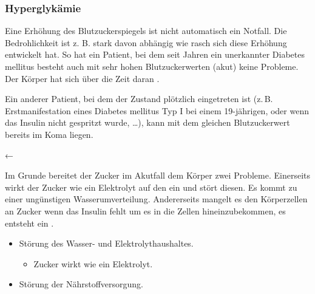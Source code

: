 \subsubsection{Hyperglykämie}
\label{topic:hyperglykaemie}



{
Eine Erhöhung des Blutzuckerspiegels ist nicht automatisch ein Notfall. Die
Bedrohlichkeit ist z. B. stark davon abhängig wie
rasch sich diese Erhöhung entwickelt hat. So hat ein
Patient, bei dem seit Jahren ein unerkannter Diabetes mellitus besteht auch mit sehr hohen Blutzuckerwerten (akut) keine
Probleme. Der Körper hat sich über die Zeit daran . 

Ein anderer
Patient, bei dem der Zustand plötzlich eingetreten ist (z.\,B.
Erstmanifestation eines Diabetes mellitus Typ I bei einem 19-jährigen, oder wenn
das Insulin nicht gespritzt wurde, \ldots), kann mit dem gleichen
Blutzuckerwert bereits im Koma liegen. 

 }
{←}
{}{}{}



{
Im Grunde bereitet der Zucker im Akutfall dem Körper zwei
Probleme. Einerseits wirkt der Zucker wie ein Elektrolyt auf den  ein und
stört diesen. Es kommt zu einer ungünstigen Wasserumverteilung. Andererseits
mangelt es den Körperzellen an Zucker wenn das Insulin fehlt um es in die
Zellen hineinzubekommen, es entsteht ein .
}{
\begin{itemize}
  \item Störung des Wasser- und Elektrolythaushaltes.
  \begin{itemize}
    \item Zucker wirkt wie ein Elektrolyt.
  \end{itemize}
  \item Störung der Nährstoffversorgung.
\end{itemize}
}{}{}{}

